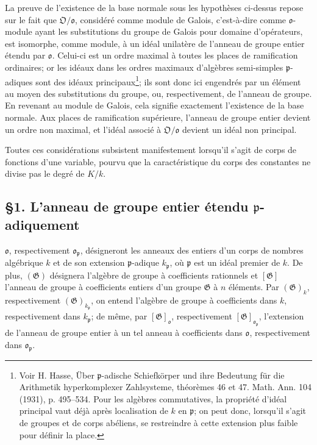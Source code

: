 La preuve de l'existence de la base normale sous les hypothèses ci-dessus repose sur le fait que \(\mathfrak{O}/\mathfrak{o}\), considéré comme module de Galois, c'est-à-dire comme \(\mathfrak{o}\)-module ayant les substitutions du groupe de Galois pour domaine d'opérateurs, est isomorphe, comme module, à un idéal unilatère de l'anneau de groupe entier étendu par \(\mathfrak{o}\). Celui-ci est un ordre maximal à toutes les places de ramification ordinaires; or les idéaux dans les ordres maximaux d'algèbres semi-simples \(\mathfrak{p}\)-adiques sont des idéaux principaux\footnote{Voir H. Hasse, Über \(\mathfrak{p}\)-adische Schiefkörper und ihre Bedeutung für die Arithmetik hyperkomplexer Zahlsysteme, théorèmes 46 et 47. Math. Ann. 104 (1931), p. 495--534. Pour les algèbres commutatives, la propriété d'idéal principal vaut déjà après localisation de \(k\) en \(\mathfrak{p}\); on peut donc, lorsqu'il s'agit de groupes et de corps abéliens, se restreindre à cette extension plus faible pour définir la place.}; ils sont donc ici engendrés par un élément au moyen des substitutions du groupe, ou, respectivement, de l'anneau de groupe. En revenant au module de Galois, cela signifie exactement l'existence de la base normale. Aux places de ramification supérieure, l'anneau de groupe entier devient un ordre non maximal, et l'idéal associé à \(\mathfrak{O}/\mathfrak{o}\) devient un idéal non principal.

Toutes ces considérations subsistent manifestement lorsqu'il s'agit de corps de fonctions d'une variable, pourvu que la caractéristique du corps des constantes ne divise pas le degré de \(K/k\).

\subsection*{\S1. L'anneau de groupe entier étendu \(\mathfrak{p}\)-adiquement}

\(\mathfrak{o}\), respectivement \(\mathfrak{o}_{\mathfrak{p}}\), désigneront les anneaux des entiers d'un corps de nombres algébrique \(k\) et de son extension \(\mathfrak{p}\)-adique \(k_{\mathfrak{p}}\), où \(\mathfrak{p}\) est un idéal premier de \(k\). De plus, \((\mathfrak{G})\) désignera l'algèbre de groupe à coefficients rationnels et \([\mathfrak{G}]\) l'anneau de groupe à coefficients entiers d'un groupe \(\mathfrak{G}\) à \(n\) éléments. Par \((\mathfrak{G})_k\), respectivement \((\mathfrak{G})_{k_{\mathfrak{p}}}\), on entend l'algèbre de groupe à coefficients dans \(k\), respectivement dans \(k_{\mathfrak{p}}\); de même, par \([\mathfrak{G}]_{\mathfrak{o}}\), respectivement \([\mathfrak{G}]_{\mathfrak{o}_{\mathfrak{p}}}\), l'extension de l'anneau de groupe entier à un tel anneau à coefficients dans \(\mathfrak{o}\), respectivement dans \(\mathfrak{o}_{\mathfrak{p}}\).

